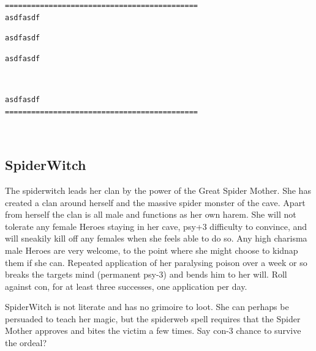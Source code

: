 \small \begin{samepage} \begin{verbatim}
============================================
asdfasdf
\end{verbatim} \end{samepage} \begin{samepage} \begin{verbatim}
asdfasdf
\end{verbatim} \end{samepage} \goodbreak \begin{samepage} \begin{verbatim}
asdfasdf
\end{verbatim} \end{samepage}   \   \goodbreak \begin{samepage} \begin{verbatim}
asdfasdf
============================================
\end{verbatim} \end{samepage} \normalsize





\

\goodbreak 
\subsection*{SpiderWitch}
\label{spiderwitch}

The spiderwitch leads her clan by the power of the Great Spider Mother. She has created a clan around herself and the massive spider monster of the cave. Apart from herself the clan is all male and functions as her own harem. She will not tolerate any female Heroes staying in her cave, psy+3 difficulty to convince, and will sneakily kill off any females when she feels able to do so. Any high charisma male Heroes are very welcome, to the point where she might choose to kidnap them if she can. Repeated application of her paralysing poison over a week or so breaks the targets mind (permanent psy-3) and bends him to her will. Roll against con, for at least three successes, one application per day.

SpiderWitch is not literate and has no grimoire to loot. She can perhaps be persuaded to teach her magic, but the spiderweb spell requires that the Spider Mother approves and bites the victim a few times. Say con-3 chance to survive the ordeal?

\

